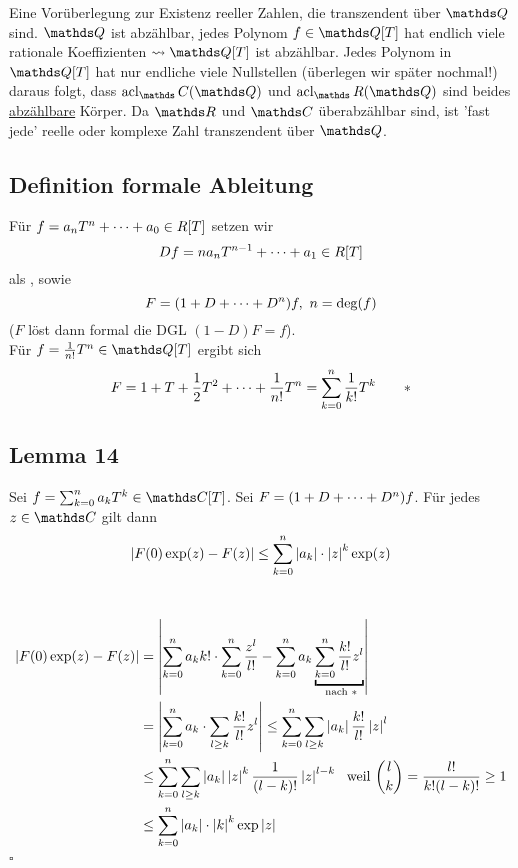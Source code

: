 Eine Vorüberlegung zur Existenz reeller Zahlen, die transzendent über $\Q$ sind.
$\Q$ ist abzählbar, jedes Polynom $f\in \Q[T]$ hat endlich viele rationale Koeffizienten $\rightsquigarrow \Q[T]$ ist abzählbar.
Jedes Polynom in $\Q[T]$ hat nur endliche viele Nullstellen (überlegen wir später nochmal!) daraus folgt, dass $\acl_\C(\Q)$ und $\acl_\R(\Q)$ sind beides \uline{abzählbare} Körper.
Da $\R$ und $\C$ überabzählbar sind, ist 'fast jede' reelle oder komplexe Zahl transzendent über $\Q$.

\subsection{Definition formale Ableitung}
\label{sub:def_formale_ableitung}
Für $f=a_nT^n+ \dots +a_0\in R[T]$ setzen wir 
\[
Df=na_nT^{n-1}+ \dots +a_1\in R[T]
\] 
als , sowie
\[
F=(1+D+ \dots +D^n)f,~n=\deg(f)
\]
($F$ löst dann formal die DGL $(1-D)F=f$).\\
Für $f=\frac{1}{n!}T^n\in \Q[T]$ ergibt sich
\[
F=1+T+\frac{1}{2}T^2+ \dots +\frac{1}{n!}T^n=\sum_{k=0}^{n}\frac{1}{k!}T^k \tag*{$\ast$}
\]

\subsection{Lemma 14}
\label{sub:lemma_14}
Sei $f=\sum_{k=0}^{n}a_kT^k\in\C[T]$.
Sei $F=(1+D+ \dots +D^n)f$.
Für jedes $z\in \C$ gilt dann
\[
\left\vert F(0)\exp(z)-F(z)\right\vert\le\sum_{k=0}^{n}\left\vert a_k\right\vert\cdot\left\vert z\right\vert^k\exp(z)
\]

\\
\begin{equation*}
\begin{aligned}
	\abs{F(0)\exp(z)-F(z)} &= \abs{\sum_{k=0}^na_kk!\cdot \sum_{k=0}^n \frac{z^l}{l!}-\sum_{k=0}^{n}a_k\underbracket{\sum_{k=0}^{n}\frac{k!}{l!}z^l}_{\text{ nach }\ast}}\\
	&= \abs{\sum_{k=0}^n a_k\cdot \sum_{l\ge k}\frac{k!}{l!}z^l} \le \sum_{k=0}^n \sum_{l\ge k}\abs{a_k} \frac{k!}{l!}\abs{z}^l\\
	&\le \sum_{k=0}^n \sum_{l\ge k}\abs{a_k}\abs{z}^k \frac{1}{(l-k)!}\abs{z}^{l-k}~\text{ weil } \binom{l}{k}=\frac{l!}{k!(l-k)!}\ge 1\\
	&\le \sum_{k=0}^{n}\abs{a_k}\cdot \abs{k}^k\exp\abs{z}
\end{aligned}
\end{equation*}
\hfill $\square$

